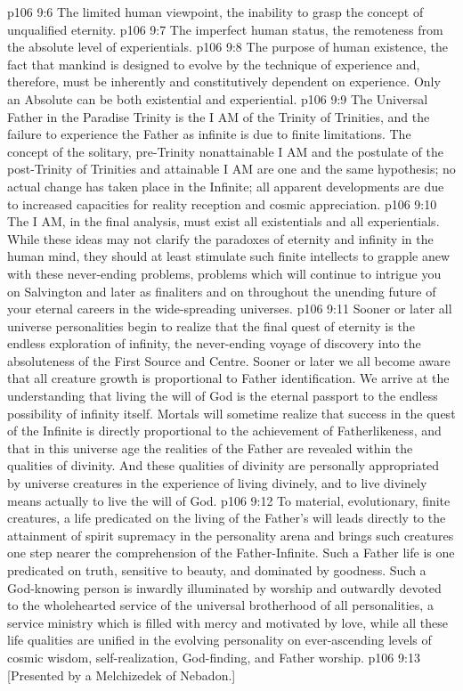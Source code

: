 \vs p106 9:6 \bibnobreakspace The limited human viewpoint, the inability to grasp the concept of unqualified eternity.
\vs p106 9:7 \bibnobreakspace The imperfect human status, the remoteness from the absolute level of experientials.
\vs p106 9:8 \bibnobreakspace The purpose of human existence, the fact that mankind is designed to evolve by the technique of experience and, therefore, must be inherently and constitutively dependent on experience. Only an Absolute can be both existential and experiential.
\vs p106 9:9 \pc The Universal Father in the Paradise Trinity is the I AM of the Trinity of Trinities, and the failure to experience the Father as infinite is due to finite limitations. The concept of the  solitary, pre\hyp{}Trinity nonattainable I AM and the postulate of the  post\hyp{}Trinity of Trinities and attainable I AM are one and the same hypothesis; no actual change has taken place in the Infinite; all apparent developments are due to increased capacities for reality reception and cosmic appreciation.
\vs p106 9:10 The I AM, in the final analysis, must exist  all existentials and  all experientials. While these ideas may not clarify the paradoxes of eternity and infinity in the human mind, they should at least stimulate such finite intellects to grapple anew with these never\hyp{}ending problems, problems which will continue to intrigue you on Salvington and later as finaliters and on throughout the unending future of your eternal careers in the wide\hyp{}spreading universes.
\vs p106 9:11 \pc Sooner or later all universe personalities begin to realize that the final quest of eternity is the endless exploration of infinity, the never\hyp{}ending voyage of discovery into the absoluteness of the First Source and Centre. Sooner or later we all become aware that all creature growth is proportional to Father identification. We arrive at the understanding that living the will of God is the eternal passport to the endless possibility of infinity itself. Mortals will sometime realize that success in the quest of the Infinite is directly proportional to the achievement of Fatherlikeness, and that in this universe age the realities of the Father are revealed within the qualities of divinity. And these qualities of divinity are personally appropriated by universe creatures in the experience of living divinely, and to live divinely means actually to live the will of God.
\vs p106 9:12 To material, evolutionary, finite creatures, a life predicated on the living of the Father’s will leads directly to the attainment of spirit supremacy in the personality arena and brings such creatures one step nearer the comprehension of the Father\hyp{}Infinite. Such a Father life is one predicated on truth, sensitive to beauty, and dominated by goodness. Such a God\hyp{}knowing person is inwardly illuminated by worship and outwardly devoted to the wholehearted service of the universal brotherhood of all personalities, a service ministry which is filled with mercy and motivated by love, while all these life qualities are unified in the evolving personality on ever\hyp{}ascending levels of cosmic wisdom, self\hyp{}realization, God\hyp{}finding, and Father worship.
\vsetoff
\vs p106 9:13 [Presented by a Melchizedek of Nebadon.]
\quizlink
